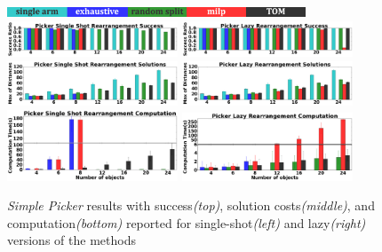 \begin{figure}[h]
\vspace{-0.2in}
	\centering
	\includegraphics[width=3.5in]{figures/results/labels}
	\includegraphics[width=2in]{figures/results/4_sp_ms_success}
	\includegraphics[width=2in]{figures/results/3_sp_lazy_ms_success}
	\includegraphics[width=2in]{figures/results/4_sp_ms_cost}
	\includegraphics[width=2in]{figures/results/3_sp_lazy_ms_cost}
	\includegraphics[width=2in]{figures/results/4_sp_ms_time}
	\includegraphics[width=2in]{figures/results/3_sp_lazy_ms_time}
	\vspace{-0.15in}
	\caption{\textit{Simple Picker} results with success\textit{(top)}, solution costs\textit{(middle)}, and computation\textit{(bottom)} reported for single-shot\textit{(left)} and lazy\textit{(right)} versions of the methods}
    \vspace{-0.3in}
	\label{fig:disk}
\end{figure}

